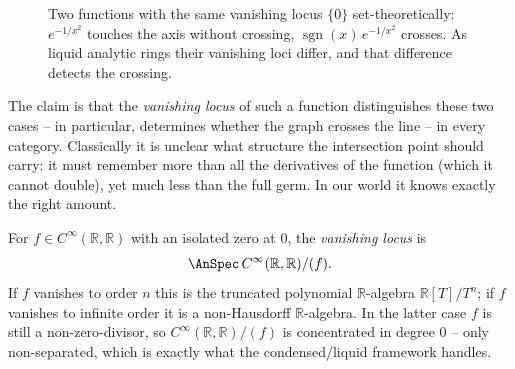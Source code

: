 \begin{figure}[ht]
\centering
{}\qquad
{}
\caption{Two functions with the same vanishing locus $\{0\}$ set-theoretically:
$e^{-1/x^2}$ touches the axis without crossing, $\operatorname{sgn}(x)\,e^{-1/x^2}$
crosses. As liquid analytic rings their vanishing loci differ, and that difference
detects the crossing.}
\label{fig:24:two-functions}
\end{figure}

\noindent The claim is that the \emph{vanishing locus} of such a function
distinguishes these two cases -- in particular, determines whether the graph
crosses the line -- in every category. Classically it is unclear what structure
the intersection point should carry: it must remember more than all the
derivatives of the function (which it cannot double), yet much less than the full
germ. In our world it knows exactly the right amount.

\begin{definition}
\label{def:24:vanishing-locus}
For $f\in C^\infty(\mathbb R,\mathbb R)$ with an isolated zero at $0$, the
\emph{vanishing locus} is
\begin{equation*}
\AnSpec\, C^\infty(\mathbb R,\mathbb R)/(f).
\end{equation*}
If $f$ vanishes to order $n$ this is the truncated polynomial $\mathbb R$-algebra
$\mathbb R[T]/T^n$; if $f$ vanishes to infinite order it is a non-Hausdorff
$\mathbb R$-algebra. In the latter case $f$ is still a non-zero-divisor, so
$C^\infty(\mathbb R,\mathbb R)/(f)$ is concentrated in degree $0$ -- only
non-separated, which is exactly what the condensed/liquid framework handles.
\end{definition}

